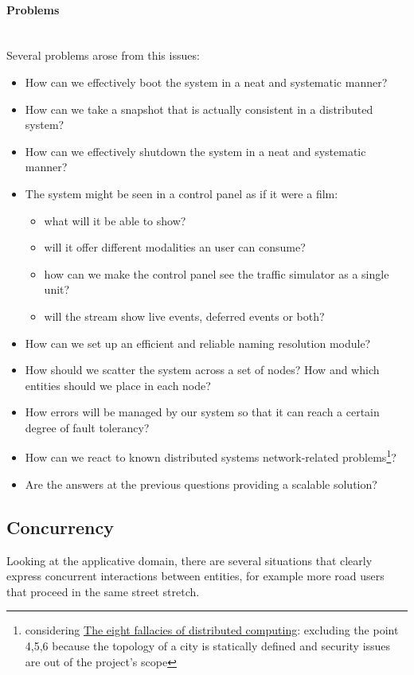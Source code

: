 \paragraph{Problems} \mbox{} \\

Several problems arose from this issues:

\begin{itemize}
\item How can we effectively boot the system in a neat and systematic manner?
\item How can we take a snapshot that is actually consistent in a distributed
  system?
\item How can we effectively shutdown the system in a neat and systematic
  manner?
\item The system might be seen in a control panel as if it were a film:
  \begin{itemize}
  \item what will it be able to show?
  \item will it offer different modalities an user can consume?
  \item how can we make the control panel see the traffic simulator as a
    single unit?
  \item will the stream show live events, deferred events or both?
  \end{itemize}
\item How can we set up an efficient and reliable naming resolution module?
\item How should we scatter the system across a set of nodes? How and which
  entities should we place in each node?
\item How errors will be managed by our system so that it can reach a certain
  degree of fault tolerancy?
\item How can we react to known distributed systems network-related 
problems\footnote{considering \href{https://blogs.oracle.com/jag/resource/Fallacies.html?cm_mc_uid=82650292107114582847614&cm_mc_sid_50200000=1458564821}{The eight fallacies of distributed computing}: excluding the point 4,5,6 because the topology of a city is statically defined and security issues are out of the project's scope}?
\item Are the answers at the previous questions providing a scalable solution?
\end{itemize}

\subsection{Concurrency}\label{sec:pa-concurrency}
Looking at the applicative domain, there are several situations that clearly
express concurrent interactions between entities, for example more road users
that proceed in the same street stretch.

